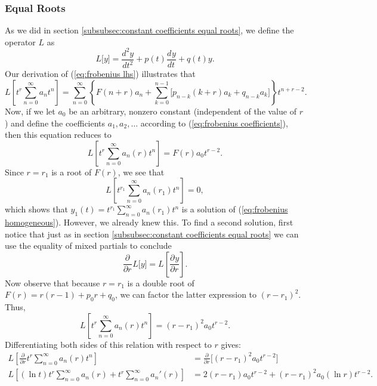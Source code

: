 \documentclass{myart}
\newcommand{\eq}[1]{(\ref{eq:#1})}
\newcommand{\deriv}[3][]{\frac{d^{#1}#2}{d#3^{#1}}}
\newcommand{\pderiv}[3][]{\frac{\partial^{#1}#2}{\partial#3^{#1}}}
\begin{document}
\subsubsection{Equal Roots}
\label{subsubsec:frobenius equal roots}

As we did in section \ref{subsubsec:constant coefficients equal
  roots}, we define the operator $L$ as
\begin{equation*}
  L\big[y\big] = \deriv[2]{y}{t} + p(t) \deriv{y}{t} + q(t) y.
\end{equation*}
Our derivation of \eq{frobenius lhs} illustrates that
\begin{equation*}
    L\left[t^r \sum_{n=0}^\infty a_n t^n\right]
  = \sum_{n=0}^\infty \left\{
      F(n + r) a_n + \sum_{k=0}^{n-1}
        \Big[p_{n-k} (k+r) a_k + q_{n-k} a_k\Big]
    \right\} t^{n+r-2}.
\end{equation*}
Now, if we let $a_0$ be an arbitrary, nonzero constant (independent of
the value of $r$) and define the coefficients $a_1, a_2, \ldots$
according to \eq{frobenius coefficients}, then this equation reduces
to
\begin{equation*}
  L\left[t^r \sum_{n=0}^\infty a_n(r) t^n\right] = F(r) a_0 t^{r-2}.
\end{equation*}
Since $r = r_1$ is a root of $F(r)$, we see that
\begin{equation*}
  L\left[t^{r_1} \sum_{n=0}^\infty a_n(r_1) t^n\right] = 0,
\end{equation*}
which shows that $y_1(t) = t^{r_1} \sum_{n=0}^\infty a_n(r_1) t^n$ is
a solution of \eq{frobenius homogeneous}. However, we already knew
this. To find a second solution, first notice that just as in section
\ref{subsubsec:constant coefficients equal roots} we can use the
equality of mixed partials to conclude
\begin{equation*}
  \pderiv{}{r} L\big[y\big] = L\left[\pderiv{y}{r}\right].
\end{equation*}
Now observe that because $r = r_1$ is a double root of $F(r) = r(r -
1) + p_0r + q_0$, we can factor the latter expression to $(r -
r_1)^2$. Thus,
\begin{equation*}
  L\left[t^r \sum_{n=0}^\infty a_n(r) t^n\right] = (r - r_1)^2 a_0 t^{r-2}.
\end{equation*}
Differentiating both sides of this relation with respect to $r$ gives:
\begin{align*}
     L\left[\pderiv{}{r} t^r \sum_{n=0}^\infty a_n(r) t^n\right]
  &= \pderiv{}{r} \bigg[(r - r_1)^2 a_0 t^{r-2}\bigg] \\
     L\left[(\ln t) t^r \sum_{n=0}^\infty a_n(r)
   + t^r \sum_{n=0}^\infty a_n'(r)\right]
  &= 2(r - r_1) a_0 t^{r-2} + (r - r_1)^2 a_0 (\ln r) t^{r-2}.
\end{align*}
\end{document}
